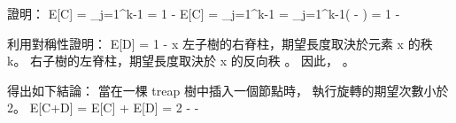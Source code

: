 \startitem%
證明：
\startformula
E[C] = \sum_{j=1}^{k-1} = 1 - 
\stopformula
\stopitem
\startANSWER
\startformula\startmathalignment
\NC E[C] \NC = \sum_{j=1}^{k-1} \NR
\NC      \NC = \sum_{j=1}^{k-1}( - ) \NR
\NC      \NC = 1 -  \NR
\stopmathalignment\stopformula
\stopANSWER

\startitem%
利用對稱性證明：
\startformula
E[D] = 1 - 
\stopformula
\stopitem
\startANSWER
x 左子樹的右脊柱，期望長度取決於元素 x 的秩 k。
右子樹的左脊柱，期望長度取決於 x 的反向秩 。
因此， 。
\stopANSWER

\startitem%
得出如下結論：
當在一棵 treap 樹中插入一個節點時，
執行旋轉的期望次數小於 2。
\stopitem
\startANSWER
\startformula
E[C+D] = E[C] + E[D] = 2 -  -  
\stopformula
\stopANSWER

\stopigBase
\stopPROBLEM

\stopsubject%
